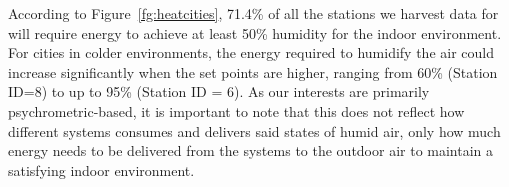 	According to Figure~\ref{fg:heatcities}, 71.4\% of all the stations we harvest data for will require energy to achieve at least 50\% humidity for the indoor environment. For cities in colder environments, the energy required to humidify the air could increase significantly when the set points are higher, ranging from 60\%  (Station ID=8) to up to 95\% (Station ID = 6). As our interests are primarily psychrometric-based, it is important to note that this does not reflect how different systems consumes and delivers said states of humid air, only how much energy needs to be delivered from the systems to the outdoor air to maintain a satisfying indoor environment. 